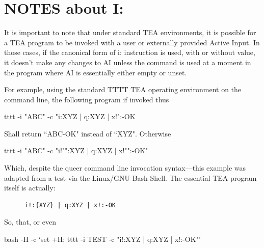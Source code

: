 \documentclass[a4paper, 18pt]{book} %
\begin{document}
\section{NOTES about I:}
\label{SECNOTEI}


It is important to note that under standard TEA environments, it is possible for a TEA program to be invoked with a user or externally provided Active Input. In those cases, if the canonical form of i: instruction is used, with or without value, it doesn't make any changes to AI unless the command is used at a moment in the program where AI is essentially either empty or unset.


For example, using the standard TTTT TEA operating environment on the command line\cite{cli_tttt}, the following program if invoked thus 


  \begin{tcbverbatim}[title=I: EXAMPLE 1: Testing conditional setting of AI]
tttt -i "ABC" -c "i:{XYZ} | q:XYZ | x!":-OK  
  \end{tcbverbatim}
  
  
  Shall return ``ABC-OK" instead of ``XYZ". Otherwise
  
  
  
    \begin{tcbverbatim}[title=I: EXAMPLE 2: Testing unconditional setting of AI]
tttt -i "ABC" -c "i!"":{XYZ} | q:XYZ | x!"":-OK" 
  \end{tcbverbatim}
  
  Which, despite the queer command line invocation syntax---this example was adapted from a test via the Linux/GNU Bash Shell\cite{FSF2023Bash}. The essential TEA program itself is actually:
  
  

  
  
  \begin{figure}[H]
 \Large
  \centering
  \begin{tcolorbox}[teaterminalstyle, title=I: EXAMPLE 3]
  \begin{lstlisting}[language=TEA]
  i!:{XYZ} | q:XYZ | x!:-OK 
   \end{lstlisting}
  \end{tcolorbox}
\end{figure}
  
  
  
So, that, or even


  \begin{tcbverbatim}[title=I: EXAMPLE 4: Testing unconditional setting of AI]
bash -H -c `set +H; tttt -i TEST -c "i!:{XYZ} | q:XYZ | x!:-OK"'   
  \end{tcbverbatim}
  
\end{document}
